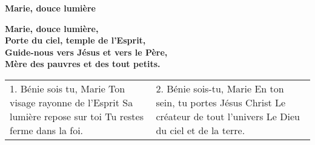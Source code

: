 \textbf{Marie, douce lumière}

\textbf{Marie, douce lumière, \\
Porte du ciel, temple de l'Esprit, \\
Guide-nous vers Jésus et vers le Père, \\
Mère des pauvres et des tout petits.}

\begin{tabular}{p{} p{}}
1. Bénie sois tu, Marie \newline
Ton visage rayonne de l'Esprit \newline
Sa lumière repose sur toi \newline
Tu restes ferme dans la foi.
&
2. Bénie sois-tu, Marie \newline
En ton sein, tu portes Jésus Christ \newline
Le créateur de tout l'univers \newline
Le Dieu du ciel et de la terre.
\end{tabular}

%
%



